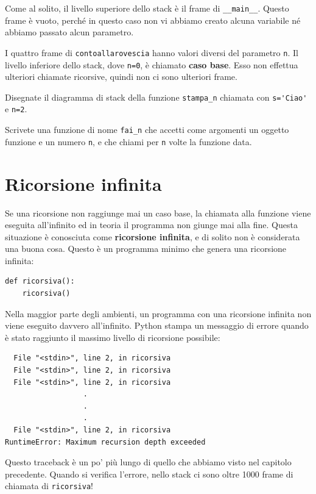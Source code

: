 \documentclass[10pt]{book}
\begin{document}
Come al solito, il livello superiore dello stack è il frame di \verb"__main__".
Questo frame è vuoto, perché in questo caso non vi abbiamo creato alcuna variabile né abbiamo passato alcun parametro.

I quattro frame di {\tt contoallarovescia} hanno valori diversi del parametro {\tt n}. Il livello inferiore dello stack, dove {\tt n=0}, è chiamato {\bf caso base}. Esso non effettua ulteriori chiamate ricorsive, quindi non ci sono ulteriori frame.

\vspace{0.2in}

\begin{exercise}
Disegnate il diagramma di stack della funzione \verb"stampa_n" chiamata con
\verb"s='Ciao'" e {\tt n=2}.
\end{exercise}

\vspace{0.2in}

\begin{exercise}
Scrivete una funzione di nome \verb"fai_n" che accetti come argomenti un oggetto funzione e un numero {\tt n}, e che chiami per {\tt n} volte la funzione data.
\end{exercise}



\section{Ricorsione infinita}


Se una ricorsione non raggiunge mai un caso base, la chiamata alla funzione viene eseguita all'infinito ed in teoria il programma non giunge mai alla fine. Questa situazione è conosciuta come {\bf ricorsione infinita}, e di solito non è considerata una buona cosa.
Questo è un programma minimo che genera una ricorsione infinita:

\begin{verbatim}
def ricorsiva():
    ricorsiva()
\end{verbatim}
%
Nella maggior parte degli ambienti, un programma con una ricorsione infinita non viene eseguito davvero all'infinito. Python stampa un messaggio di errore quando è stato raggiunto il massimo livello di ricorsione possibile:

\begin{verbatim}
  File "<stdin>", line 2, in ricorsiva
  File "<stdin>", line 2, in ricorsiva
  File "<stdin>", line 2, in ricorsiva
                  .   
                  .
                  .
  File "<stdin>", line 2, in ricorsiva
RuntimeError: Maximum recursion depth exceeded
\end{verbatim}
%
Questo traceback è un po' più lungo di quello che abbiamo visto nel capitolo precedente. Quando si verifica l'errore, nello stack ci sono oltre 1000 frame di chiamata di {\tt ricorsiva}!
\end{document}
